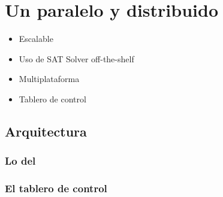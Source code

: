 \chapter{Un \ssolver paralelo y distribuido }
\label{ssolver-pardist}

\begin{itemize}
	\item Escalable
	\item Uso de SAT Solver off-the-shelf
	\item Multiplataforma
	\item Tablero de control
\end{itemize}

\section{Arquitectura}

\subsection{Lo del \cluster}

\subsection{El tablero de control}

